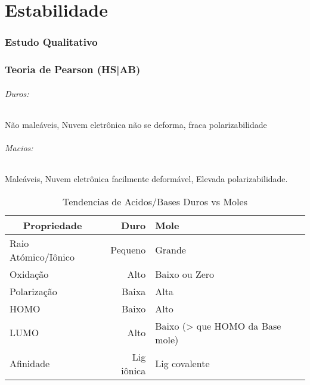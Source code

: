 \documentclass{article}
\renewcommand\arraystretch{1.25}	%
\begin{document}
\newpage

\part{Estabilidade}
\label{estabilidade}

\section*{Estudo Qualitativo}

\section{Teoria de Pearson (HS|AB)}
\label{hsab}

\begin{multicols}{2}

	\paragraph{Duros:} 
	\textcolor{Emph}{Não maleáveis}, Nuvem eletrônica não se deforma, fraca polarizabilidade
\\	\paragraph{Macios:}
	\textcolor{Emph}{Maleáveis}, Nuvem eletrônica facilmente deformável, Elevada polarizabilidade.
	

\end{multicols}

{
\renewcommand\arraystretch{1.3}	%

\begin{table}[H]\centering
\begin{tabular}{l r l}
	
	\multicolumn{1}{c}{Propriedade}
	& \multicolumn{1}{r}{Duro}
	& \multicolumn{1}{l}{Mole}
	
	\\ \toprule
	
	Raio Atómico/Iônico
	& Pequeno
	& Grande
	
	\\ Oxidação
	& Alto
	& Baixo ou Zero
	
	\\ Polarização
	& Baixa
	& Alta
	
	\\ HOMO
	& Baixo
	& Alto
	
	\\ LUMO
	& Alto
	& Baixo (> que HOMO da Base mole)
	
	\\ Afinidade
	& Lig iônica
	& Lig covalente
		
	\\ \bottomrule
	
\end{tabular}
\caption{Tendencias de Acidos/Bases Duros vs Moles}
\end{table}
}
\end{document}
